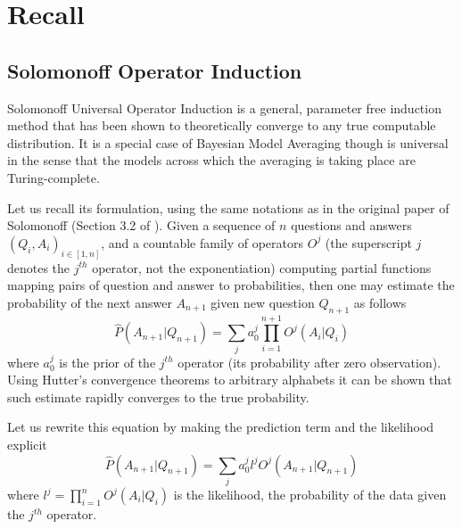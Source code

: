 \documentclass[runningheads]{llncs}
\begin{document}

\section{Recall}
\label{recall}

\subsection{Solomonoff Operator Induction}
\label{sol-op-ind}
Solomonoff Universal Operator Induction \cite{Solomonoff08Three} is a
general, parameter free induction method that has been shown to
theoretically converge to any true computable distribution.  It is a
special case of Bayesian Model Averaging \cite{Hoeting99bayesianmodel}
though is universal in the sense that the models across which the
averaging is taking place are Turing-complete.

Let us recall its formulation, using the same notations as in the
original paper of Solomonoff (Section 3.2 of
\cite{Solomonoff08Three}). Given a sequence of $n$ questions and
answers $(Q_i, A_i)_{i \in [1, n]}$, and a countable family of
operators $O^j$ (the superscript $j$ denotes the $j^{th}$ operator,
not the exponentiation) computing partial functions mapping pairs of
question and answer to probabilities, then one may estimate the
probability of the next answer $A_{n+1}$ given new question $Q_{n+1}$
as follows
\begin{equation}
  \label{sol}
  \hat{P}(A_{n+1}|Q_{n+1}) = \sum_j a_0^j \prod_{i=1}^{n+1} O^j(A_i|Q_i)
\end{equation}
where $a_0^j$ is the prior of the $j^{th}$ operator (its probability
after zero observation). Using Hutter's convergence theorems to
arbitrary alphabets \cite{Hutter03Optimality} it can be shown that
such estimate rapidly converges to the true probability.

Let us rewrite this equation by making the prediction term and the
likelihood explicit
\begin{equation}
  \label{sol-eas}
\hat{P}(A_{n+1}|Q_{n+1}) = \sum_j a_0^j l^j O^j(A_{n+1}|Q_{n+1})
\end{equation}
where $l^j = \prod_{i=1}^{n} O^j(A_i|Q_i)$ is the likelihood, the
probability of the data given the $j^{th}$ operator.\\
\end{document}
